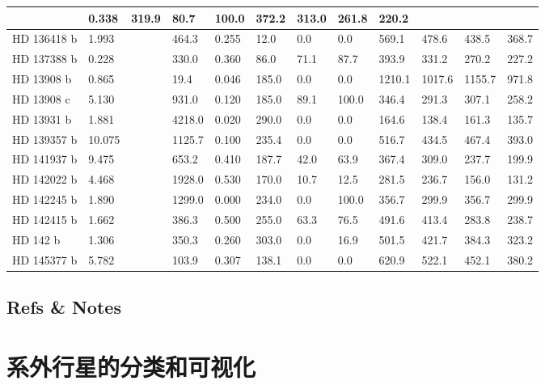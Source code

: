 \documentclass[letterpaper,10pt,english]{sphinxmanual}
\begin{document}
\begin{longtable}{|l|l|l|l|l|l|l|l|l|l|l|l|}
 & 
0.338
 & 
319.9
 & 
80.7
 & 
100.0
 & 
372.2
 & 
313.0
 & 
261.8
 & 
220.2
\\
\hline
HD 136418 b
 & 
1.993
 &  & 
464.3
 & 
0.255
 & 
12.0
 & 
0.0
 & 
0.0
 & 
569.1
 & 
478.6
 & 
438.5
 & 
368.7
\\
\hline
HD 137388 b
 & 
0.228
 &  & 
330.0
 & 
0.360
 & 
86.0
 & 
71.1
 & 
87.7
 & 
393.9
 & 
331.2
 & 
270.2
 & 
227.2
\\
\hline
HD 13908 b
 & 
0.865
 &  & 
19.4
 & 
0.046
 & 
185.0
 & 
0.0
 & 
0.0
 & 
1210.1
 & 
1017.6
 & 
1155.7
 & 
971.8
\\
\hline
HD 13908 c
 & 
5.130
 &  & 
931.0
 & 
0.120
 & 
185.0
 & 
89.1
 & 
100.0
 & 
346.4
 & 
291.3
 & 
307.1
 & 
258.2
\\
\hline
HD 13931 b
 & 
1.881
 &  & 
4218.0
 & 
0.020
 & 
290.0
 & 
0.0
 & 
0.0
 & 
164.6
 & 
138.4
 & 
161.3
 & 
135.7
\\
\hline
HD 139357 b
 & 
10.075
 &  & 
1125.7
 & 
0.100
 & 
235.4
 & 
0.0
 & 
0.0
 & 
516.7
 & 
434.5
 & 
467.4
 & 
393.0
\\
\hline
HD 141937 b
 & 
9.475
 &  & 
653.2
 & 
0.410
 & 
187.7
 & 
42.0
 & 
63.9
 & 
367.4
 & 
309.0
 & 
237.7
 & 
199.9
\\
\hline
HD 142022 b
 & 
4.468
 &  & 
1928.0
 & 
0.530
 & 
170.0
 & 
10.7
 & 
12.5
 & 
281.5
 & 
236.7
 & 
156.0
 & 
131.2
\\
\hline
HD 142245 b
 & 
1.890
 &  & 
1299.0
 & 
0.000
 & 
234.0
 & 
0.0
 & 
100.0
 & 
356.7
 & 
299.9
 & 
356.7
 & 
299.9
\\
\hline
HD 142415 b
 & 
1.662
 &  & 
386.3
 & 
0.500
 & 
255.0
 & 
63.3
 & 
76.5
 & 
491.6
 & 
413.4
 & 
283.8
 & 
238.7
\\
\hline
HD 142 b
 & 
1.306
 &  & 
350.3
 & 
0.260
 & 
303.0
 & 
0.0
 & 
16.9
 & 
501.5
 & 
421.7
 & 
384.3
 & 
323.2
\\
\hline
HD 145377 b
 & 
5.782
 &  & 
103.9
 & 
0.307
 & 
138.1
 & 
0.0
 & 
0.0
 & 
620.9
 & 
522.1
 & 
452.1
 & 
380.2
\\
\hline\end{longtable}



\subsection{Refs \& Notes}
\label{hztable:refs-notes}

\section{系外行星的分类和可视化}
\label{viscat::doc}\label{viscat:id1}
\end{document}
